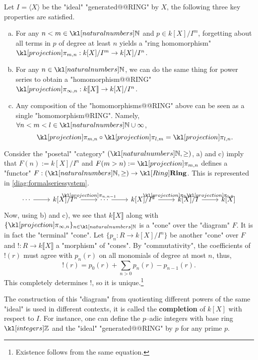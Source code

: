 \documentclass[main.tex]{subfiles}
\begin{document}
\begin{exmps}
\begin{enumerate}
        Let $I = \langle X \rangle$ be the "ideal" "generated@@RING" by $X$, the following three key properties are satisfied.%
        \begin{enumerate}[a)]
            \item For any $n < m \in \N$ and $p \in k[X]/I^m$, forgetting about all terms in $p$ of degree at least $n$ yields a "ring homomorphism" $\projection_{m,n}: k[X]/I^m \rightarrow k[X]/I^n$.
            \item For any $n \in \N$, we can do the same thing for power series to obtain a "homomorphism@@RING" $\projection_{\infty,n}: k\llbracket X \rrbracket \rightarrow k[X]/I^n$.
            \item Any composition of the "homomorphisms@@RING" above can be seen as a single "homomorphism@RING". Namely, $\forall n < m < l \in \N \cup \infty$, \[\projection_{m,n} \circ \projection_{l,m} = \projection_{l,n}.\]
        \end{enumerate}
        Consider the "posetal" "category" $(\N, \geq)$, a) and c) imply that $F(n) := k[X]/I^n$ and $F(m>n) := \projection_{m,n}$ defines a "functor" $F: (\N, \geq) \rightarrow \catRing$. This is represented in \eqref{diag:formalseriessystem}.
        \begin{equation}\label{diag:formalseriessystem}
            \begin{tikzcd}
                \cdots \arrow[r] & {k[X]/I^n} \arrow[r, "{\projection_{n,n-1}}"] & \cdots \arrow[r] & {k[X]/I^2} \arrow[r, "{\projection_{2,1}}"] & {k[X]/I} \arrow[r, "{\projection_{1,0}}"] & {k[X]}
            \end{tikzcd}
        \end{equation}
        Now, using b) and c), we see that $k\llbracket X \rrbracket$ along with $\{\projection_{\infty,n}\}_{n\in \N}$ is a "cone" over the "diagram" $F$. It is in fact the "terminal" "cone". Let $\{p_n: R \rightarrow k[X]/I^n\}$ be another "cone" over $F$ and $!:R \rightarrow k\llbracket X \rrbracket$ a "morphism" of "cones". By "commutativity", the coefficients of $!(r)$ must agree with $p_n(r)$ on all monomials of degree at most $n$, thus,
        \[!(r) = p_0(r) + \sum_{n > 0} p_n(r) - p_{n-1}(r).\]
        This completely determines $!$, so it is unique.\footnote{Existence follows from the same equation.}

        The construction of this "diagram" from quotienting different powers of the same "ideal" is used in different contexts, it is called the \textbf{completion} of $k[X]$ with respect to $I$. For instance, one can define the $p$--adic integers with base ring $\Z$ and the "ideal" "generated@@RING" by $p$ for any prime $p$.
    \end{enumerate}
\end{exmps}
\end{document}
